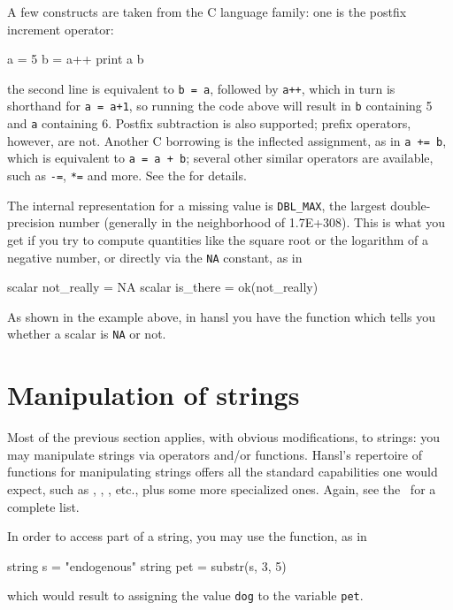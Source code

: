 A few constructs are taken from the C language family: one is the
postfix increment operator:
\begin{code}
  a = 5
  b = a++
  print a b
\end{code}
the second line is equivalent to \texttt{b = a}, followed by
\texttt{a++}, which in turn is shorthand for \texttt{a = a+1}, so
running the code above will result in \texttt{b} containing 5 and
\texttt{a} containing 6. Postfix subtraction is also supported; prefix
operators, however, are not. Another C borrowing is the inflected
assignment, as in \texttt{a += b}, which is equivalent to \texttt{a =
  a + b}; several other similar operators are available, such as
\texttt{-=}, \texttt{*=} and more. See the \GCR{} for details.

The internal representation for a missing value is \texttt{DBL\_MAX},
the largest double-precision number (generally in the neighborhood of
1.7E+308). This is what you get if you try to compute quantities like
the square root or the logarithm of a negative number, or directly via
the \texttt{NA} constant, as in
\begin{code}
  scalar not_really = NA
  scalar is_there = ok(not_really)
\end{code}
As shown in the example above, in hansl you have the  function
which tells you whether a scalar is \texttt{NA} or not.

\section{Manipulation of strings}

Most of the previous section applies, with obvious modifications, to
strings: you may manipulate strings via operators and/or
functions. Hansl's repertoire of functions for manipulating strings
offers all the standard capabilities one would expect, such as
, , , etc., plus some more
specialized ones. Again, see the \GCR\ for a complete list.

In order to access part of a string, you may use the 
function, as in
\begin{code}
  string s = "endogenous"
  string pet = substr(s, 3, 5)
\end{code}
which would result to assigning the value \texttt{dog} to the variable
\texttt{pet}.

